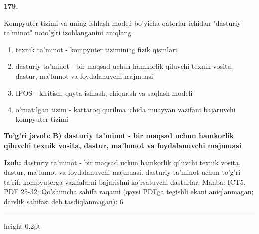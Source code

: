 \documentclass[10pt,a4paper]{article}
\begin{document}
{\bfseries\sffamily\color{ink} 179.}
\par
Kompyuter tizimi va uning ishlash modeli bo'yicha qatorlar ichidan "dasturiy ta'minot" noto'g'ri izohlanganini aniqlang.
\begin{enumerate}[label=\Alph*),leftmargin=9mm]
\item texnik ta'minot - kompyuter tizimining fizik qismlari
\item dasturiy ta'minot - bir maqsad uchun hamkorlik qiluvchi texnik vosita, dastur, ma'lumot va foydalanuvchi majmuasi
\item IPOS - kiritish, qayta ishlash, chiqarish va saqlash modeli
\item o'rnatilgan tizim - kattaroq qurilma ichida muayyan vazifani bajaruvchi kompyuter tizimi
\end{enumerate}
\begin{tcolorbox}[enhanced,breakable,colback=teal!4,colframe=teal!60!black,boxrule=0.45pt,arc=1.2mm,left=2.7mm,right=2.7mm,top=1.8mm,bottom=1.8mm,before skip=2mm,after skip=2mm]
{\bfseries\sffamily\color{teal}To'g'ri javob:} \textbf{B) dasturiy ta'minot - bir maqsad uchun hamkorlik qiluvchi texnik vosita, dastur, ma'lumot va foydalanuvchi majmuasi}
\par\smallskip
{\bfseries Izoh:} dasturiy ta'minot - bir maqsad uchun hamkorlik qiluvchi texnik vosita, dastur, ma'lumot va foydalanuvchi majmuasi. dasturiy ta'minot uchun to'g'ri ta'rif: kompyuterga vazifalarni bajarishni ko'rsatuvchi dasturlar. Manba: ICT5, PDF 25-32; Qo'shimcha sahifa raqami (qaysi PDFga tegishli ekani aniqlanmagan; darslik sahifasi deb tasdiqlanmagan): 6
\end{tcolorbox}
\vspace{2mm}\hrule height 0.2pt\vspace{3mm}
\end{document}

